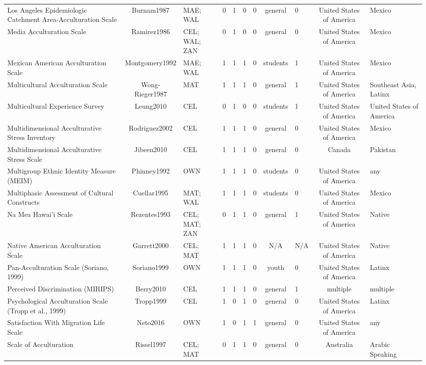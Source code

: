 \begin{longtable}[l]{lclclclclcl}
Los Angeles Epidemiologic Catchment Area-Acculturation Scale & Burnam1987 & MAE; WAL & 0 & 1 & 0 & 0 & general & 0 & United States of America & Mexico\\
Media Acculturation Scale & Ramirez1986 & CEL; WAL; ZAN & 0 & 1 & 0 & 0 & general & 0 & United States of America & Mexico\\
Mexican American Acculturation Scale & Montgomery1992 & MAE; WAL & 1 & 1 & 1 & 0 & students & 1 & United States of America & Mexico\\
Multicultural Acculturation Scale & Wong-Rieger1987 & MAT & 1 & 1 & 1 & 0 & general & 1 & United States of America & Southeast Asia, Latinx\\
Multicultural Experience Survey & Leung2010 & CEL & 0 & 1 & 0 & 0 & students & 1 & United States of America & United States of America\\
Multidimensional Acculturative Stress Inventory & Rodriguez2002 & CEL & 1 & 1 & 1 & 0 & general & 0 & United States of America & Mexico\\
Multidimensional Acculturative Stress Scale & Jibeen2010 & CEL & 1 & 1 & 1 & 0 & general & 0 & Canada & Pakistan\\
Multigroup Ethnic Identity Measure (MEIM) & Phinney1992 & OWN & 1 & 1 & 1 & 0 & students & 0 & United States of America & any\\
Multiphasic Assessment of Cultural Constructs & Cuellar1995 & MAT; WAL & 1 & 1 & 1 & 0 & students & 0 & United States of America & Mexico\\
Na Mea Hawai’i Scale & Rezentes1993 & CEL; MAT; ZAN & 0 & 1 & 1 & 0 & general & 1 & United States of America & Native\\
Native American Acculturation Scale & Garrett2000 & CEL; MAT & 1 & 1 & 1 & 0 & N/A & N/A & United States of America & Native\\
Pan-Acculturation Scale (Soriano, 1999) & Soriano1999 & OWN & 1 & 1 & 1 & 0 & youth & 0 & United States of America & Latinx\\
Perceived Discrimination (MIRIPS) & Berry2010 & CEL & 1 & 1 & 1 & 0 & general & 1 & multiple & multiple\\
Psychological Acculturation Scale (Tropp et al., 1999) & Tropp1999 & CEL & 1 & 0 & 1 & 0 & general & 0 & United States of America & Latinx\\
Satisfaction With Migration Life Scale & Neto2016 & OWN & 1 & 0 & 1 & 1 & general & 0 & United States of America & any\\
Scale of Acculturation & Rissel1997 & CEL; MAT & 0 & 1 & 1 & 0 & general & 0 & Australia & Arabic Speaking\\

\end{longtable}
